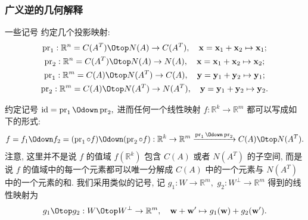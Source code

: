\begin{frame}
\frametitle{广义逆的几何解释}

\begin{block}{一些记号}
约定几个投影映射:
\begin{gather*}
\operatorname{pr}_1: \mathbb{R}^n = C(A^T) \Otop N(A) \to C(A^T), \quad \mathbf{x} = \mathbf{x}_1 + \mathbf{x}_2 \mapsto \mathbf{x}_1;\\
\operatorname{pr}_2: \mathbb{R}^n = C(A^T) \Otop N(A) \to N(A), \quad \mathbf{x} = \mathbf{x}_1 + \mathbf{x}_2 \mapsto \mathbf{x}_2;\\
\operatorname{pr}_1: \mathbb{R}^m = C(A) \Otop N(A^T) \to C(A), \quad \mathbf{y} = \mathbf{y}_1 + \mathbf{y}_2 \mapsto \mathbf{y}_1;\\
\operatorname{pr}_2: \mathbb{R}^m = C(A) \Otop N(A^T) \to N(A^T), \quad \mathbf{y} = \mathbf{y}_1 + \mathbf{y}_2 \mapsto \mathbf{y}_2.
\end{gather*}
\end{block}
约定记号 $\operatorname{id} = \operatorname{pr}_1 \Odown \operatorname{pr}_2,$ 进而任何一个线性映射 $f: \mathbb{R}^k \to \mathbb{R}^m$ 都可以写成如下的形式:
\[
f = f_1 \Odown f_2 = (\operatorname{pr}_1 \circ f) \Odown (\operatorname{pr}_2 \circ f): \mathbb{R}^k \to \mathbb{R}^m \xrightarrow{\operatorname{pr}_1 \Odown \operatorname{pr}_2} C(A) \Otop N(A^T).
\]
\alert{注意, 这里并不是说 $f$ 的值域 $f(\mathbb{R}^k)$ 包含 $C(A)$ 或者 $N(A^T)$ 的子空间, 而是说 $f$ 的值域中的每一个元素都可以唯一分解成 $C(A)$ 中的一个元素与 $N(A^T)$ 中的一个元素的和.}
我们采用类似的记号, 记 $g_1: W \to \mathbb{R}^m,$ $g_2: W^\perp \to \mathbb{R}^m$ 得到的线性映射为
\[
g_1 \Otop g_2: W \Otop W^\perp \to \mathbb{R}^m, \quad \mathbf{w} + \mathbf{w}' \mapsto g_1(\mathbf{w}) + g_2(\mathbf{w}').
\]

\end{frame}


